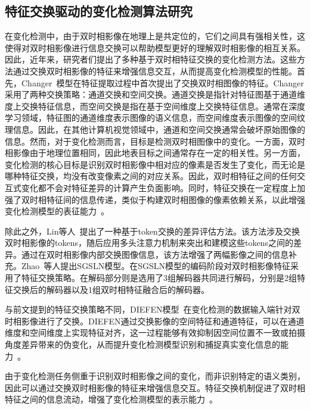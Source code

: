 \subsection{特征交换驱动的变化检测算法研究}

在变化检测中，由于双时相影像在地理上是共定位的，它们之间具有强相关性，这使得对双时相影像进行信息交换可以帮助模型更好的理解双时相影像的相互关系。因此，近年来，研究者们提出了多种基于双时相特征交换的变化检测方法。这些方法通过交换双时相影像的特征来增强信息交互，从而提高变化检测模型的性能。首先，Changer~\cite{Fang2022ChangerFI}模型在特征提取过程中首次提出了交换双时相图像的特征。Changer 采用了两种交换策略：通道交换和空间交换。通道交换是指针对特征图基于通道维度上交换特征信息，而空间交换是指在基于空间维度上交换特征信息。通常在深度学习领域，特征图的通道维度表示图像的语义信息，而空间维度表示图像的空间纹理信息。因此，在其他计算机视觉领域中，通道和空间交换通常会破坏原始图像的信息。然而，对于变化检测而言，目标是检测双时相图像中的变化。一方面，双时相影像由于地理位置相同，因此地表目标之间通常存在一定的相关性。另一方面，变化检测的核心目标是识别双时相影像中相对应的像素是否发生了变化，而无论是哪种特征交换，均没有改变像素之间的对应关系。因此，双时相特征之间的任何交互式变化都不会对特征差异的计算产生负面影响。同时，特征交换在一定程度上加强了双时相特征间的信息传递，类似于构建双时相图像的像素依赖关系，以此增强变化检测模型的表征能力~\cite{Wang2017NonlocalNN}。

除此之外，Lin等人~\cite{Lin2024DiFormerAD}提出了一种基于token交换的差异评估方法。该方法涉及交换双时相影像的tokens，随后应用多头注意力机制来突出和建模这些tokens之间的差异。通过在双时相影像内部交换图像信息，该方法增强了两幅影像之间的信息补充。Zhao~\cite{zhao_exchanging_2023}等人提出SGSLN模型。在SGSLN模型的编码阶段对双时相影像特征采用了特征交换策略。在解码部分则是选用了3组解码器共同进行解码，分别是2组特征交换后的解码器以及1组双时相特征融合后的解码器。

与前文提到的特征交换策略不同，DIEFEN模型~\cite{Wu2024DIEFENDI}在变化检测的数据输入端针对双时相影像进行了交换。DIEFEN通过交换影像的空间特征和通道特征，可以在通道维度和空间维度上实现特征对齐，这一过程能够有效抑制因空间位置不一致或拍摄角度差异带来的伪变化，从而提升变化检测模型识别和捕捉真实变化信息的能力~\cite{Wu2024DIEFENDI}。

由于变化检测任务侧重于识别双时相影像之间的变化，而非识别特定的语义类别，因此可以通过交换双时相影像的特征来增强信息交互。特征交换机制促进了双时相特征之间的信息流动，增强了变化检测模型的表示能力~\cite{zhao_exchanging_2023,Fang2022ChangerFI,Liu2024ExploringTC}。

